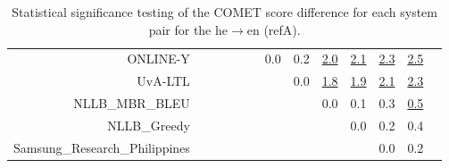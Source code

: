 \documentclass[11pt]{article}
\begin{document}
\begin{sidewaystable}
\begin{center}
{\begin{tabular}{rcccccccccccc}
ONLINE-Y &    &  &  &  &  & \cellcolor{red!0} 0.0 & \cellcolor{red!0} 0.2 & \cellcolor{red!70} \underline{2.0} & \cellcolor{red!70} \underline{2.1} & \cellcolor{red!70} \underline{2.3} & \cellcolor{red!70} \underline{2.5}\\ 
UvA-LTL &    &  &  &  &  &  & \cellcolor{red!0} 0.0 & \cellcolor{red!70} \underline{1.8} & \cellcolor{red!70} \underline{1.9} & \cellcolor{red!70} \underline{2.1} & \cellcolor{red!70} \underline{2.3}\\ 
NLLB\_MBR\_BLEU &   &  &  &  &  &  &  & \cellcolor{red!0} 0.0 & \cellcolor{red!0} 0.1 & \cellcolor{red!0} 0.3 & \cellcolor{red!70} \underline{0.5}\\ 
NLLB\_Greedy &    &  &  &  &  &  &  &  & \cellcolor{red!0} 0.0 & \cellcolor{red!0} 0.2 & \cellcolor{red!60} 0.4\\ 
Samsung\_Research\_Philippines &    &  &  &  &  &  &  &  &  & \cellcolor{red!0} 0.0 & \cellcolor{red!0} 0.2\\ 
\bottomrule 
\end{tabular} }
\caption{Statistical significance testing of the COMET score difference for each system pair for the he$\rightarrow$en (refA).} 
 \end{center} \end{sidewaystable} 
\end{document}
